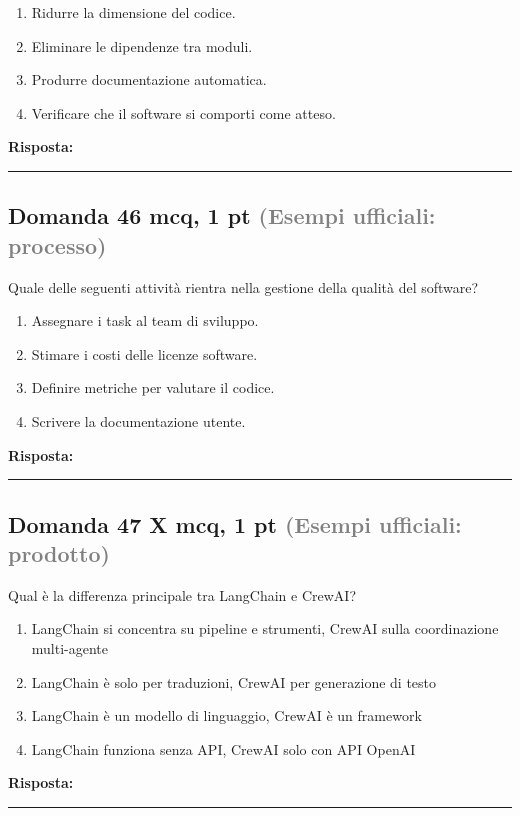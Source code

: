 \documentclass[a4paper,11pt]{article}
\begin{document}
\begin{enumerate}[label=\alph*)]
\item Ridurre la dimensione del codice.
\item Eliminare le dipendenze tra moduli.
\item Produrre documentazione automatica.
\item Verificare che il software si comporti come atteso.
\end{enumerate}
\vspace{0.2cm}
\noindent\textbf{Risposta:}\par
\vspace{1.5cm}\hrule


\subsection*{Domanda 46 \hfill {\small mcq, 1 pt \textcolor{gray}{(Esempi ufficiali: processo)}}}
Quale delle seguenti attività rientra nella gestione della qualità del software?

\begin{enumerate}[label=\alph*)]
\item Assegnare i task al team di sviluppo.
\item Stimare i costi delle licenze software.
\item Definire metriche per valutare il codice.
\item Scrivere la documentazione utente.
\end{enumerate}
\vspace{0.2cm}
\noindent\textbf{Risposta:}\par
\vspace{1.5cm}\hrule


\subsection*{Domanda 47 X \hfill {\small mcq, 1 pt \textcolor{gray}{(Esempi ufficiali: prodotto)}}}
Qual è la differenza principale tra LangChain e CrewAI?

\begin{enumerate}[label=\alph*)]
\item LangChain si concentra su pipeline e strumenti, CrewAI sulla coordinazione multi-agente
\item LangChain è solo per traduzioni, CrewAI per generazione di testo
\item LangChain è un modello di linguaggio, CrewAI è un framework
\item LangChain funziona senza API, CrewAI solo con API OpenAI
\end{enumerate}
\vspace{0.2cm}
\noindent\textbf{Risposta:}\par
\vspace{1.5cm}\hrule
\end{document}
